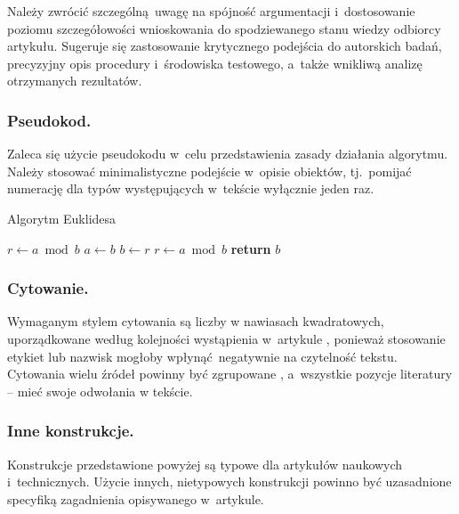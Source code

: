 Należy zwrócić szczególną uwagę na spójność argumentacji i~dostosowanie poziomu szczegółowości wnioskowania do spodziewanego stanu wiedzy odbiorcy artykułu. Sugeruje się zastosowanie krytycznego podejścia do autorskich badań, precyzyjny opis procedury i~środowiska testowego, a~także wnikliwą analizę otrzymanych rezultatów.

\subsubsection{Pseudokod.}
\label{subsubsec:pseudocode}

Zaleca się użycie pseudokodu w~celu przedstawienia zasady działania algorytmu. Należy stosować minimalistyczne podejście w~opisie obiektów, tj.~pomijać numerację dla typów występujących w~tekście wyłącznie jeden raz.

\vspace{-4mm}
\begin{algorithm}
	\renewcommand{\thealgorithm}{} %
	\caption{Algorytm Euklidesa} \label{alg:euclid}
	\begin{algorithmic}[1]
		 
			\State $r\gets a\bmod b$
			 
				\State $a\gets b$
				\State $b\gets r$
				\State $r\gets a\bmod b$
			\EndWhile \label{alg:euclid:endwhile}
			\State \textbf{return} $b$
		\EndProcedure
	\end{algorithmic}
\end{algorithm}
\vspace{-8mm}

\subsubsection{Cytowanie.}
\label{subsubsec:cite}

Wymaganym stylem cytowania są liczby w nawiasach kwadratowych, uporządkowane według kolejności wystąpienia w~artykule \cite{ref:lncs}, ponieważ stosowanie etykiet lub nazwisk mogłoby wpłynąć negatywnie na czytelność tekstu. Cytowania wielu źródeł powinny być zgrupowane \cite{ref:lncs,ref:latex}, a~wszystkie pozycje literatury -- mieć swoje odwołania w tekście.

\subsubsection{Inne konstrukcje.}
\label{subsubsec:others}

Konstrukcje przedstawione powyżej są typowe dla artykułów naukowych i~technicznych. Użycie innych, nietypowych konstrukcji powinno być uzasadnione specyfiką zagadnienia opisywanego w~artykule.
